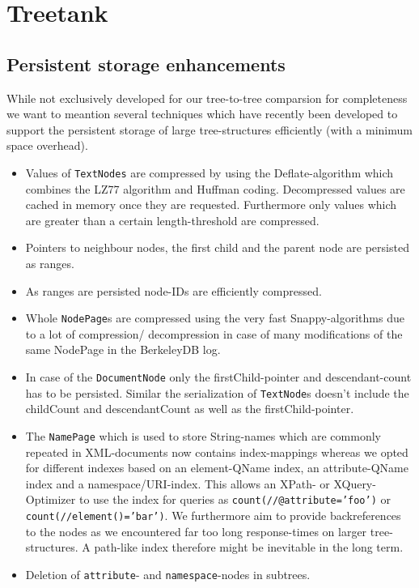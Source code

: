 \section{Treetank}\label{sec::treetank}

\subsection{Persistent storage enhancements}\label{subsec::storage}
While not exclusively developed for our tree-to-tree comparsion for completeness we want to meantion several techniques which have recently been developed to support the persistent storage of large tree-structures efficiently (with a minimum space overhead).

\begin{itemize}
\item Values of \texttt{TextNodes} are compressed by using the Deflate-algorithm which combines the LZ77 algorithm and Huffman coding. Decompressed values are cached in memory once they are requested. Furthermore only values which are greater than a certain length-threshold are compressed.
\item Pointers to neighbour nodes, the first child and the parent node are persisted as ranges.
\item As ranges are persisted node-IDs are efficiently compressed.
\item Whole \texttt{NodePage}s are compressed using the very fast Snappy-algorithms due to a lot of compression/ decompression in case of many modifications of the same NodePage in the BerkeleyDB log.
\item In case of the \texttt{DocumentNode} only the firstChild-pointer and descendant-count has to be persisted. Similar the serialization of \texttt{TextNode}s doesn't include the childCount and descendantCount as well as the firstChild-pointer.
\item The \texttt{NamePage} which is used to store String-names which are commonly repeated in XML-documents now contains index-mappings whereas we opted for different indexes based on an element-QName index, an attribute-QName index and a namespace/URI-index. This allows an XPath- or XQuery- Optimizer to use the index for queries as \texttt{count(//@attribute='foo')} or\\ \texttt{count(//element()='bar')}. We furthermore aim to provide backreferences to the nodes as we encountered far too long response-times on larger tree-structures. A path-like index therefore might be inevitable in the long term.
\item Deletion of \texttt{attribute}- and \texttt{namespace}-nodes in subtrees.
\end{itemize}

